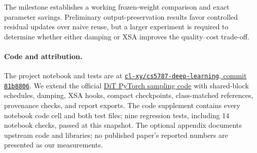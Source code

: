 \documentclass[sigconf,nonacm]{acmart}
\begin{document}
The milestone establishes a working frozen-weight comparison and exact
parameter savings. Preliminary output-preservation results favor controlled
residual updates over naive reuse, but a larger experiment is required to
determine whether either damping or XSA improves the quality--cost trade-off.

\paragraph{Code and attribution.}
The project notebook and tests are at
\href{https://github.com/cl-xy/cs5787-deep-learning/tree/81b8806}{\texttt{cl-xy/cs5787-deep-learning}, commit \texttt{81b8806}}.
We extend the official \href{https://github.com/facebookresearch/DiT/tree/ed81ce2229091fd4ecc9a223645f95cf379d582b}{DiT PyTorch sampling code}
with shared-block schedules, damping, XSA hooks, compact checkpoints,
class-matched references, provenance checks, and report exports. The code
supplement contains every notebook code cell and both test files; nine
regression tests, including 14 notebook checks, passed at this snapshot.
The optional appendix documents upstream code and libraries; no published
paper's reported numbers are presented as our measurements.



\ifdefined\IncludeCodeAppendix
 \clearpage\appendix
\fi
\end{document}
